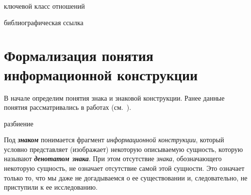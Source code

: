 \begin{SCn}
    \begin{scnrelfromlist}{ключевой класс отношений}
    \end{scnrelfromlist}

    \bigskip

    \begin{scnrelfromlist}{библиографическая ссылка}
    \end{scnrelfromlist}

\end{SCn}

\section{Формализация понятия информационной конструкции}
\label{section_information_construction_formalization}

В начале определим понятия знака и знаковой конструкции.
Ранее данные понятия рассматривались в работах (см.~\textit{}).

\begin{SCn}

    \begin{scnrelfromset}{разбиение}
    \end{scnrelfromset}

\end{SCn}

Под \textbf{\textit{знаком}} понимается фрагмент \textit{информационной конструкции}, который условно представляет (изображает) некоторую описываемую сущность, которую называют \textbf{\textit{денотатом знака}}.
При этом отсутствие \textit{знака}, обозначающего некоторую сущность, не означает отсутствие самой этой сущности.
Это означает только то, что мы даже не догадываемся о ее существовании и, следовательно, не приступили к ее исследованию.


